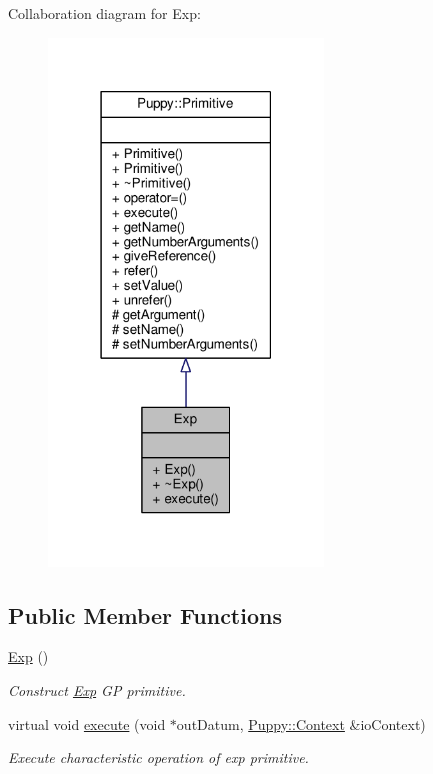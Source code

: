 Collaboration diagram for Exp\+:
\nopagebreak
\begin{figure}[H]
\begin{center}
\leavevmode
\includegraphics[width=207pt]{classExp__coll__graph}
\end{center}
\end{figure}
\subsection*{Public Member Functions}
\begin{DoxyCompactItemize}
\item 
\hypertarget{classExp_aacde419dcd80d7576643b4b529c0168f}{}\hyperlink{classExp_aacde419dcd80d7576643b4b529c0168f}{Exp} ()\label{classExp_aacde419dcd80d7576643b4b529c0168f}

\begin{DoxyCompactList}\small\item\em Construct \hyperlink{classExp}{Exp} G\+P primitive. \end{DoxyCompactList}\item 
virtual void \hyperlink{classExp_af04e8771ab5a8b572779d0703efa2736}{execute} (void $\ast$out\+Datum, \hyperlink{classPuppy_1_1Context}{Puppy\+::\+Context} \&io\+Context)
\begin{DoxyCompactList}\small\item\em Execute characteristic operation of exp primitive. \end{DoxyCompactList}\end{DoxyCompactItemize}
